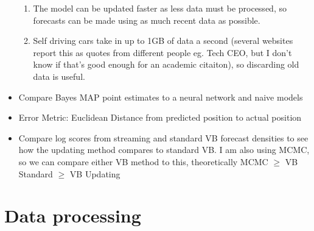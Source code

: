 \documentclass[12pt,a4paper]{article}\usepackage[]{graphicx}\usepackage[]{color}
\begin{document}
\begin{itemize}
\begin{enumerate}
\item The model can be updated faster as less data must be processed, so forecasts can be made using as much recent data as possible.
\item Self driving cars take in up to 1GB of data a second (several websites report this as quotes from different people eg. Tech CEO, but I don't know if that's good enough for an academic citaiton), so discarding old data is useful.
\end{enumerate}
\item Compare Bayes MAP point estimates to a neural network and naive models
\item Error Metric: Euclidean Distance from predicted position to actual position
\item Compare log scores from streaming and standard VB forecast densities to see how the updating method compares to standard VB. I am also using MCMC, so we can compare either VB method to this, theoretically MCMC $\geq$ VB Standard $\geq$ VB Updating
\end{itemize}

\section{Data processing}
\end{document}
